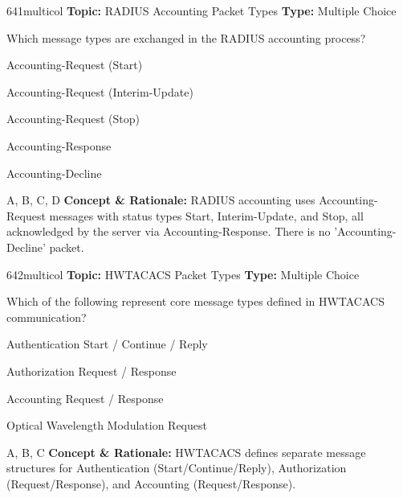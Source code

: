 \begin{qcard}{641}{multicol}
\textcolor{darkslate!75}{\small\textbf{Topic:} RADIUS Accounting Packet Types \hfill \textbf{Type:} Multiple Choice}\vspace{0.4em}\par
Which message types are exchanged in the RADIUS accounting process?
\begin{qoptions}
\item Accounting-Request (Start)
\item Accounting-Request (Interim-Update)
\item Accounting-Request (Stop)
\item Accounting-Response
\item Accounting-Decline
\end{qoptions}
\end{qcard}
\nopagebreak
\begin{explainbox}{A, B, C, D}
\textbf{Concept \& Rationale:} RADIUS accounting uses Accounting-Request messages with status types Start, Interim-Update, and Stop, all acknowledged by the server via Accounting-Response. There is no 'Accounting-Decline' packet.
\end{explainbox}

\begin{qcard}{642}{multicol}
\textcolor{darkslate!75}{\small\textbf{Topic:} HWTACACS Packet Types \hfill \textbf{Type:} Multiple Choice}\vspace{0.4em}\par
Which of the following represent core message types defined in HWTACACS communication?
\begin{qoptions}
\item Authentication Start / Continue / Reply
\item Authorization Request / Response
\item Accounting Request / Response
\item Optical Wavelength Modulation Request
\end{qoptions}
\end{qcard}
\nopagebreak
\begin{explainbox}{A, B, C}
\textbf{Concept \& Rationale:} HWTACACS defines separate message structures for Authentication (Start/Continue/Reply), Authorization (Request/Response), and Accounting (Request/Response).
\end{explainbox}

